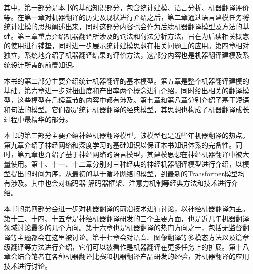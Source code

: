 \begin{spacing}{1.18}
其中，第一部分是本书的基础知识部分，包含统计建模、语言分析、机器翻译评价等。在第一章对机器翻译的历史及现状进行介绍之后，第二章通过语言建模任务将统计建模的思想阐述出来，同时这部分内容也会作为后续机器翻译模型及方法的基础。第三章重点介绍机器翻译所涉及的词法和句法分析方法，旨在为后续相关概念的使用进行铺垫，同时进一步展示统计建模思想在相关问题上的应用。第四章相对独立，系统地介绍了机器翻译结果的评价方法，这部分内容也是机器翻译建模及系统设计所需的前置知识。

本书的第二部分主要介绍统计机器翻译的基本模型。第五章是整个机器翻译建模的基础。第六章进一步对扭曲度和产出率两个概念进行介绍，同时给出相关的翻译模型，这些模型在后续章节的内容中都有涉及。第七章和第八章分别介绍了基于短语和句法的模型。它们都是统计机器翻译的经典模型，其思想也构成了机器翻译成长过程中最精华的部分。

本书的第三部分主要介绍神经机器翻译模型，该模型也是近些年机器翻译的热点。第九章介绍了神经网络和深度学习的基础知识以保证本书知识体系的完备性。同时，第九章也介绍了基于神经网络的语言模型，其建模思想在神经机器翻译中被大量使用。第十、十一、十二章分别对三种经典的神经机器翻译模型进行介绍，以模型提出的时间为序，从最初的基于循环网络的模型，到最新的Transformer模型均有涉及。其中也会对编码器-解码器框架、注意力机制等经典方法和技术进行介绍。

本书的第四部分会进一步对机器翻译的前沿技术进行讨论，以神经机器翻译为主。第十三、十四、十五章是神经机器翻译研发的三个主要方面，也是近几年机器翻译领域讨论最多的几个方向。第十六章也是机器翻译的热门方向之一，包括无监督翻译等主题都会在这里被讨论。第十七章会对语音、图像翻译等多模态方法以及篇章级翻译等方法进行介绍，它们可以被看作是机器翻译在更多任务上的扩展。第十八章会结合笔者在各种机器翻译比赛和机器翻译产品研发的经验，对机器翻译的应用技术进行讨论。

\begin{figure}[htp]
\centering
\centering

\end{figure}

\end{spacing}








